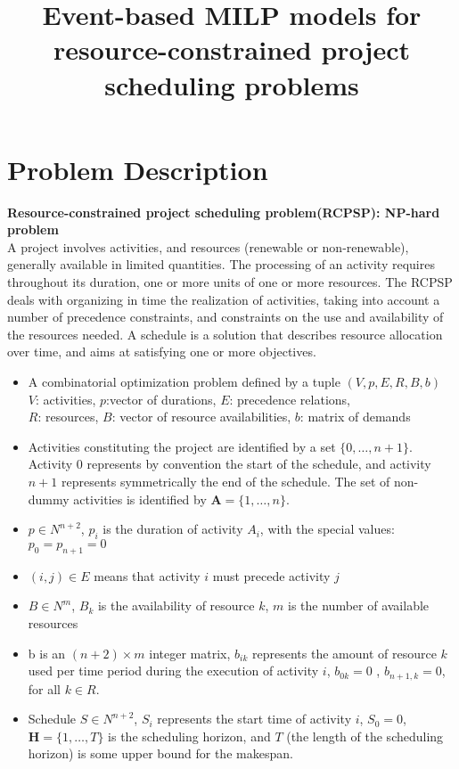 \documentclass{paper}
\begin{document}
	
	\title{Event-based MILP models for resource-constrained project scheduling problems}
	
	\maketitle
	
	\section*{Problem Description}
	
	\textbf{Resource-constrained project scheduling problem(RCPSP): NP-hard problem}
	\\A project involves activities, and resources (renewable or non-renewable), generally available in limited quantities. 
	The processing of an activity requires throughout its duration, one or more units of one or more resources. 
	The RCPSP deals with organizing in time the realization of activities, taking into account a number of precedence constraints, and constraints on the use and availability of the resources needed. 
	A schedule is a solution that describes resource allocation over time, and aims at satisfying one or more objectives.
	\begin{itemize}
		\item A combinatorial optimization problem defined by a tuple $(V,p,E,R,B,b)$
		\\$V$: activities, $p$:vector of durations, $E$: precedence relations,
		\\$R$: resources, $B$: vector of resource availabilities, $b$: matrix of demands
		\item  Activities constituting the project are identified by a set $\{0,\dots,n+1\}$.
		Activity $0$ represents by convention the start of the schedule, and activity $n + 1$ represents symmetrically the end of the schedule. 
		The set of non-dummy activities is identified by $\mathbf{A}=\{1,\dots,n\}$.
		\item $p\in N^{n+2}$, $p_i$ is the duration of activity $A_i$, with the special values: $p_0 = p_{n+1} = 0$
		\item $(i, j)\in E$ means that activity $i$ must precede activity $j$
		\item $B\in N^m$, $B_k$ is the availability of resource $k$, $m$ is the number of available resources
		\item b is an $(n+2)\times m$ integer matrix, $b_{ik}$ represents the amount of resource $k$ used per time period during the execution of activity $i$,
		$b_{0k} = 0$ , $b_{n+1,k} = 0$, for all $k \in R$.
		\item Schedule $S\in N^{n+2}$, $S_i$ represents the start time of activity $i$, $S_0=0$, $\mathbf{H}=\{1,\dots,T\}$ is the scheduling horizon, 
		and $T$ (the length of the scheduling horizon) is some upper bound for the makespan.
	\end{itemize} 
	
\end{document}
